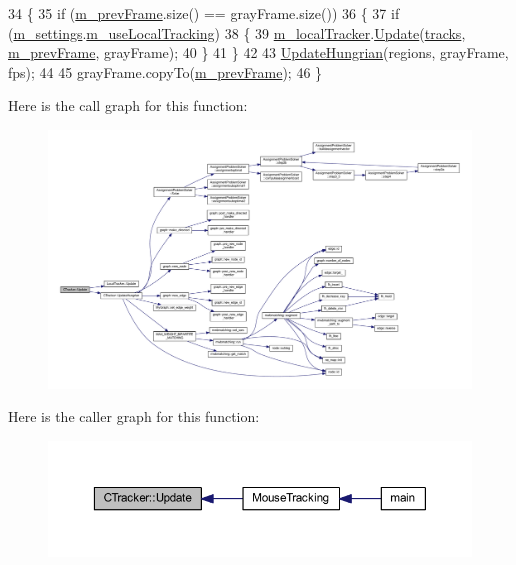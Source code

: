 \begin{DoxyCode}
34 \{
35     \textcolor{keywordflow}{if} (\mbox{\hyperlink{class_c_tracker_a045ff08d0d83d89a9733657defdc9794}{m\_prevFrame}}.size() == grayFrame.size())
36     \{
37         \textcolor{keywordflow}{if} (\mbox{\hyperlink{class_c_tracker_acb84aee0d550f4cdadbfac6735811050}{m\_settings}}.\mbox{\hyperlink{struct_tracker_settings_a64f4e2f0b2eaeae47316690ab5a5e620}{m\_useLocalTracking}})
38         \{
39             \mbox{\hyperlink{class_c_tracker_a0f7f687608e94fb1c1a94f49e7c2c784}{m\_localTracker}}.\mbox{\hyperlink{class_local_tracker_a7fad09ebaf507de2a400ec17ec96fa56}{Update}}(\mbox{\hyperlink{class_c_tracker_a86d322bc042985711c8d5ec8b9614230}{tracks}}, \mbox{\hyperlink{class_c_tracker_a045ff08d0d83d89a9733657defdc9794}{m\_prevFrame}}, grayFrame);
40         \}
41     \}
42 
43     \mbox{\hyperlink{class_c_tracker_a9fd9223baba528c3c6522241391126ef}{UpdateHungrian}}(regions, grayFrame, fps);
44 
45     grayFrame.copyTo(\mbox{\hyperlink{class_c_tracker_a045ff08d0d83d89a9733657defdc9794}{m\_prevFrame}});
46 \}
\end{DoxyCode}
Here is the call graph for this function\+:\nopagebreak
\begin{figure}[H]
\begin{center}
\leavevmode
\includegraphics[width=350pt]{class_c_tracker_aad6f4e7a80a1b71522644a1f8c052f21_cgraph}
\end{center}
\end{figure}
Here is the caller graph for this function\+:\nopagebreak
\begin{figure}[H]
\begin{center}
\leavevmode
\includegraphics[width=350pt]{class_c_tracker_aad6f4e7a80a1b71522644a1f8c052f21_icgraph}
\end{center}
\end{figure}
\mbox{\label{class_c_tracker_a9fd9223baba528c3c6522241391126ef}} 
